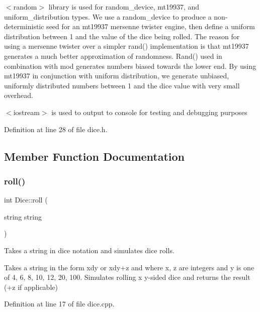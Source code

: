 $<$random$>$ library is used for random\+\_\+device, mt19937, and uniform\+\_\+distribution types. We use a random\+\_\+device to produce a non-\/deterministic seed for an mt19937 mersenne twister engine, then define a uniform distribution between 1 and the value of the dice being rolled. The reason for using a mersenne twister over a simpler rand() implementation is that mt19937 generates a much better approximation of randomness. Rand() used in combination with mod generates numbers biased towards the lower end. By using mt19937 in conjunction with uniform distribution, we generate unbiased, uniformly distributed numbers between 1 and the dice value with very small overhead.

$<$iostream$>$ is used to output to console for testing and debugging purposes 

Definition at line 28 of file dice.\+h.



\subsection{Member Function Documentation}
\hypertarget{class_dice_a4923bdf22040579e6e071e1e987916c2}{}\label{class_dice_a4923bdf22040579e6e071e1e987916c2} 
\subsubsection{\texorpdfstring{roll()}{roll()}}
{\footnotesize\ttfamily int Dice\+::roll (\begin{DoxyParamCaption}\item[{string}]{string }\end{DoxyParamCaption})\hspace{0.3cm}{\ttfamily [static]}}



Takes a string in dice notation and simulates dice rolls. 

Takes a string in the form xdy or xdy+z and where x, z are integers and y is one of 4, 6, 8, 10, 12, 20, 100. Simulates rolling x y-\/sided dice and returns the result (+z if applicable) 

Definition at line 17 of file dice.\+cpp.



